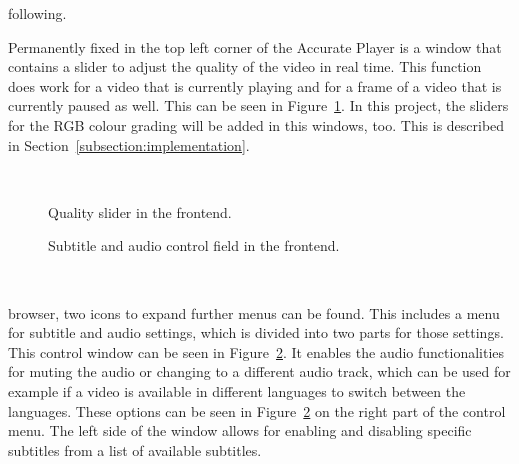 \documentclass[../MasterThesis.tex]{subfiles}
\begin{document}
\begin{minipage}{0.5\textwidth}
%	
\vspace*{0.7em}
following.

	
Permanently fixed in the top left corner of the Accurate Player is a window that contains a slider to adjust the quality of the video in real time. This function does work for a video that is currently playing and for a frame of a video that is currently paused as well. This can be seen in Figure~\ref{figure:qualityslider}. 
In this project, the sliders for the RGB colour grading will be added in this windows, too. This is described in Section~\ref{subsection:implementation}.

\end{minipage}\begin{minipage}{0.05\textwidth}
	\ 
\end{minipage}\begin{minipage}{0.45\textwidth}
	
\begin{figure}[H]
	\begin{center}
		\caption[Quality slider in the frontend.]{Quality slider in the frontend.}
		\label{figure:qualityslider} 
	\end{center}
\end{figure}
\end{minipage}

\vspace*{0.2em}

\begin{minipage}{0.5\textwidth}
	\begin{figure}[H]
		\begin{center}
			\caption[Subtitle and audio control field in the frontend.]{Subtitle and audio control field in the frontend.}
			\label{figure:subtitles}
		\end{center}
	\end{figure}
\vfill
\end{minipage}\begin{minipage}{0.05\textwidth}
	\ 
\end{minipage}\begin{minipage}{0.45\textwidth}
browser, two icons to expand further menus can be found. 
This includes a menu for subtitle and audio settings, which is divided into two parts for those settings. This control window can be seen in Figure~\ref{figure:subtitles}. It enables the audio functionalities for muting the audio or changing to a different audio track, which can be used for example if a video is available in different languages to switch between the languages. These options can be seen in Figure~\ref{figure:subtitles} on the right part of the control menu.
The left side of the window allows for enabling and disabling specific subtitles from a list of available subtitles. 
%
%
\end{minipage}
\end{document}
